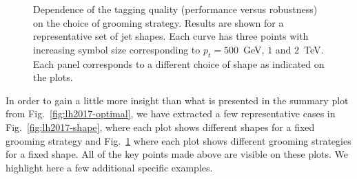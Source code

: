 \begin{figure}
  \hfill%
  \caption{Dependence of the tagging quality (performance
    versus robustness) on the choice of grooming strategy.
    Results are shown for a representative set of jet shapes.
    Each curve has three points with increasing symbol size corresponding
    to $p_t=500$~GeV, $1$ and $2$~TeV.
    Each panel corresponds to a different choice of shape
    as indicated on the plots.}\label{fig:lh2017-grooming}
\end{figure}

In order to gain a little more insight than what is presented in the
summary plot from Fig.~\ref{fig:lh2017-optimal}, we have extracted a
few representative cases in Fig.~\ref{fig:lh2017-shape}, where each
plot shows different shapes for a fixed grooming strategy and
Fig.~\ref{fig:lh2017-grooming} where each plot shows different
grooming strategies for a fixed shape.
%
All of the key points made above are visible on these plots. We
highlight here a few additional specific examples.

